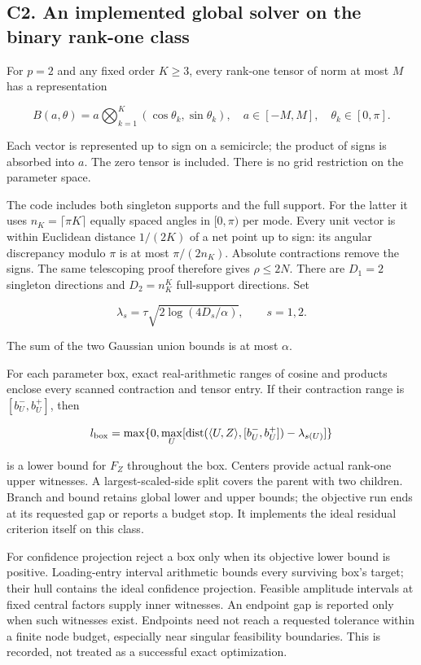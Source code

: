 \documentclass[
  10pt,
]{article}
\begin{document}
\subsection{C2. An implemented global solver on the binary rank-one
class}\label{c2.-an-implemented-global-solver-on-the-binary-rank-one-class}

For \(p=2\) and any fixed order \(K\ge3\), every rank-one tensor of norm
at most \(M\) has a representation

\[B(a,\theta)=a\bigotimes_{k=1}^K(\cos\theta_k,\sin\theta_k),
\quad a\in[-M,M],\quad\theta_k\in[0,\pi].\]

Each vector is represented up to sign on a semicircle; the product of
signs is absorbed into \(a\). The zero tensor is included. There is no
grid restriction on the parameter space.

The code includes both singleton supports and the full support. For the
latter it uses \(n_K=\lceil\pi K\rceil\) equally spaced angles in
\([0,\pi)\) per mode. Every unit vector is within Euclidean distance
\(1/(2K)\) of a net point up to sign: its angular discrepancy modulo
\(\pi\) is at most \(\pi/(2n_K)\). Absolute contractions remove the
signs. The same telescoping proof therefore gives \(\rho\le2N\). There
are \(D_1=2\) singleton directions and \(D_2=n_K^K\) full-support
directions. Set

\[\lambda_s=\tau\sqrt{2\log(4D_s/\alpha)},\qquad s=1,2.\]

The sum of the two Gaussian union bounds is at most \(\alpha\).

For each parameter box, exact real-arithmetic ranges of cosine and
products enclose every scanned contraction and tensor entry. If their
contraction range is \([b_U^-,b_U^+]\), then

\[l_{\rm box}=\max\{0,\max_U[
\operatorname{dist}(\langle U,Z\rangle,[b_U^-,b_U^+])-\lambda_{s(U)}]\}\]

is a lower bound for \(F_Z\) throughout the box. Centers provide actual
rank-one upper witnesses. A largest-scaled-side split covers the parent
with two children. Branch and bound retains global lower and upper
bounds; the objective run ends at its requested gap or reports a budget
stop. It implements the ideal residual criterion itself on this class.

For confidence projection reject a box only when its objective lower
bound is positive. Loading-entry interval arithmetic bounds every
surviving box's target; their hull contains the ideal confidence
projection. Feasible amplitude intervals at fixed central factors supply
inner witnesses. An endpoint gap is reported only when such witnesses
exist. Endpoints need not reach a requested tolerance within a finite
node budget, especially near singular feasibility boundaries. This is
recorded, not treated as a successful exact optimization.
\end{document}
